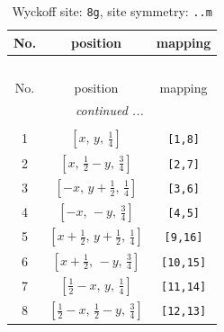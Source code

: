 \documentclass[fleqn,8pt]{jsarticle}
\begin{document}
\begin{longtable}{ccc}
\caption{Wyckoff site: {\tt 8g}, site symmetry: {\tt ..m}}
 \\
 \hline \hline
No. & position & mapping \\ \hline \endfirsthead

\multicolumn{2}{l}{\tablename\ \thetable{}} \\
 \hline \hline
No. & position & mapping \\ \hline \endhead

 \hline \hline
\multicolumn{2}{r}{\footnotesize\it continued ...} \\ \endfoot

 \hline \hline
\multicolumn{2}{r}{} \\ \endlastfoot

1 & $\left[ x,\, y,\, \frac{1}{4} \right]$ & {\tt [1,8]} \\ \hline
2 & $\left[ x,\, \frac{1}{2} - y,\, \frac{3}{4} \right]$ & {\tt [2,7]} \\ \hline
3 & $\left[ - x,\, y + \frac{1}{2},\, \frac{1}{4} \right]$ & {\tt [3,6]} \\ \hline
4 & $\left[ - x,\, - y,\, \frac{3}{4} \right]$ & {\tt [4,5]} \\ \hline
5 & $\left[ x + \frac{1}{2},\, y + \frac{1}{2},\, \frac{1}{4} \right]$ & {\tt [9,16]} \\ \hline
6 & $\left[ x + \frac{1}{2},\, - y,\, \frac{3}{4} \right]$ & {\tt [10,15]} \\ \hline
7 & $\left[ \frac{1}{2} - x,\, y,\, \frac{1}{4} \right]$ & {\tt [11,14]} \\ \hline
8 & $\left[ \frac{1}{2} - x,\, \frac{1}{2} - y,\, \frac{3}{4} \right]$ & {\tt [12,13]} \\
\end{longtable}
\renewcommand{\arraystretch}{1.2}
\end{document}
